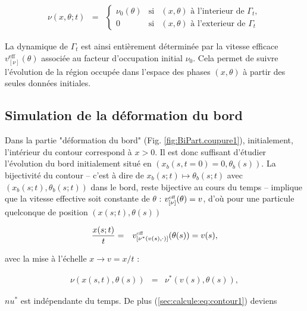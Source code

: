 \begin{eqnarray}
	\label{sec:calcule:eq:contour1}
	\nu(x, \theta ; t ) & = & \left \{ \begin{array}{rcl}\nu_0(\theta) & \mbox{si} & \mbox{$(x, \theta)$ à l'interieur de $\Gamma_t$}, \\ 0 & \mbox{si} & \mbox{$(x, \theta)$ à l'exterieur de $\Gamma_t$}\end{array} \right.
\end{eqnarray}




La dynamique de $\Gamma_t$ est ainsi entièrement déterminée par la vitesse efficace $v^{\mathrm{eff}}_{[\nu]}(\theta)$ associée au facteur d’occupation initial $\nu_0$. Cela permet de suivre l’évolution de la région occupée dans l’espace des phases $(x, \theta)$ à partir des seules données initiales.


\subsection{Simulation de la déformation du bord} 

Dans la partie "déformation du bord" (Fig. \ref{fig:BiPart.coupure1}), initialement, l'intérieur du contour correspond à $x > 0$. Il est donc suffisant d'étudier l'évolution du bord initialement situé en $(x_b(s, t = 0 ) = 0 , \theta_b(s))$. La bijectivité du contour -- c'est à dire de $x_b(s;t) \mapsto \theta_b(s;t)$ avec $(x_b(s;t) , \theta_b(s;t))$ dans le bord, reste bijective au cours du temps -- implique que la vitesse effective soit constante de $\theta$ : $v_{[\nu]}^{\mbox{\tiny eff}} ( \theta  ) = v$, d'où pour une particule quelconque  de position $(x(s;t) , \theta(s))$ 

\begin{eqnarray*}
	\frac{x(s;t)}{t} & = &	v_{[\nu^\ast (  v(s) , \cdot )]}^{\mbox{\tiny eff}} ( \theta(s)  ) = v(s),
\end{eqnarray*}

avec la mise à l’échelle $x\to v = x/t$ :

\begin{eqnarray*}
	\nu(x(s,t),\theta(s)) & = &  \nu^\ast(v(s),\theta(s)), 
\end{eqnarray*}

$nu^\ast$ est indépendante du temps. De plus (\ref{sec:calcule:eq:contour1}) deviens 

